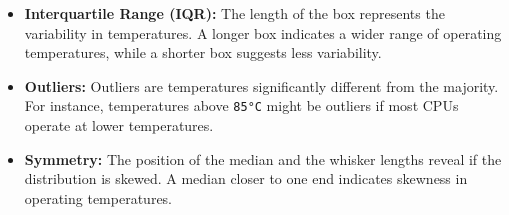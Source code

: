 \documentclass{article}
\begin{document}
\begin{itemize}
\begin{itemize}
\begin{itemize}
				\item \textbf{Interquartile Range (IQR):} The length of the box represents the variability in temperatures. A longer box indicates a wider range of operating temperatures, while a shorter box suggests less variability.
				\item \textbf{Outliers:} Outliers are temperatures significantly different from the majority. For instance, temperatures above \texttt{85°C} might be outliers if most CPUs operate at lower temperatures.
				\item \textbf{Symmetry:} The position of the median and the whisker lengths reveal if the distribution is skewed. A median closer to one end indicates skewness in operating temperatures.
			\end{itemize}
		\end{itemize}
	\end{itemize}
\end{document}
